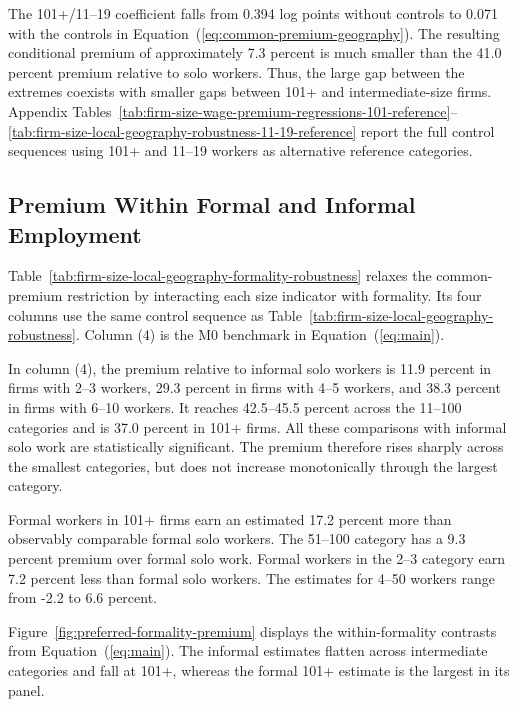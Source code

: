 The 101+/11--19 coefficient falls from 0.394 log points without controls to
0.071 with the controls in Equation~(\ref{eq:common-premium-geography}).
The resulting conditional premium of approximately
7.3 percent is much smaller than the 41.0 percent premium relative to solo
workers. Thus, the large gap between the extremes coexists with smaller gaps
between 101+ and intermediate-size firms. Appendix
Tables~\ref{tab:firm-size-wage-premium-regressions-101-reference}--\ref{tab:firm-size-local-geography-robustness-11-19-reference}
report the full control sequences using 101+ and 11--19 workers as
alternative reference categories.

\subsection{Premium Within Formal and Informal Employment}
\label{subsec:preferred-results}

Table~\ref{tab:firm-size-local-geography-formality-robustness} relaxes the
common-premium restriction by interacting each size indicator with formality.
Its four columns use the same control sequence as
Table~\ref{tab:firm-size-local-geography-robustness}. Column (4) is the M0 benchmark in Equation~(\ref{eq:main}).



In column (4), the premium relative to informal solo workers is
11.9 percent in firms with 2--3 workers, 29.3 percent in firms with 4--5 workers,
and 38.3 percent in firms with 6--10 workers. It reaches 42.5--45.5 percent
across the 11--100 categories and is 37.0 percent in 101+ firms. All these
comparisons with informal solo work are statistically significant. The premium
therefore rises sharply across the smallest categories, but does not increase
monotonically through the largest category.

Formal workers in 101+ firms earn an estimated
17.2 percent more than observably comparable formal solo workers. The 51--100
category has a 9.3 percent premium over formal solo work. Formal workers in
the 2--3 category earn 7.2 percent less than formal solo workers.
The estimates for 4--50 workers range from -2.2 to 6.6 percent.

Figure~\ref{fig:preferred-formality-premium} displays the within-formality
contrasts from Equation~(\ref{eq:main}).
The informal estimates flatten across intermediate categories and fall at
101+, whereas the formal 101+ estimate is the largest in its panel.

